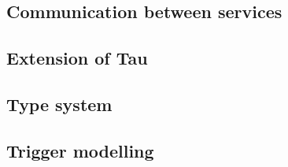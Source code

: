 \documentclass[../DraftNotes.tex]{subfiles}
\begin{document}
\subsection{Communication between services}



\subsection{Extension of Tau}



\subsection{Type system}



\subsection{Trigger modelling}


\end{document}
